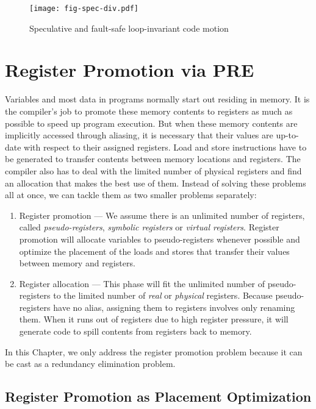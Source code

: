 \begin{figure}
\centering
\texttt{[image: fig-spec-div.pdf]}
\caption{Speculative and fault-safe loop-invariant code motion}
\label{fig:spec-div}
\end{figure}

\section{Register Promotion via PRE}

Variables and most data in programs normally start out residing in memory.
It is the compiler's job to promote these memory contents to registers as
much as possible to speed up program execution.  But when these memory contents 
are implicitly accessed through aliasing, it is necessary that their values
are up-to-date with respect to their assigned registers.  Load and store
instructions have to be generated to transfer contents between memory locations
and registers.  The compiler also has to deal with the limited number of 
physical registers and find an allocation that makes the best use of them.  
Instead of solving these problems all at once, we can tackle them as two
smaller problems separately:
\begin{enumerate}
\item Register promotion --- We assume there is an unlimited number of 
registers, called \emph{pseudo-registers}, \emph{symbolic registers} or 
\emph{virtual registers}. Register promotion will allocate variables to
pseudo-registers whenever possible and optimize the placement of the loads
and stores that transfer their values between memory and registers.
\item Register allocation --- This phase will fit the unlimited number of
pseudo-registers to the limited number of \emph{real} or \emph{physical}
registers.  Because pseudo-registers have no alias, assigning them to registers
involves only renaming them.  When it runs out of registers due to high
register pressure, it will generate code to spill contents from registers
back to memory.
\end{enumerate}

In this Chapter, we only address the register promotion problem because it can
be cast as a redundancy elimination problem.

\subsection{Register Promotion as Placement Optimization}

